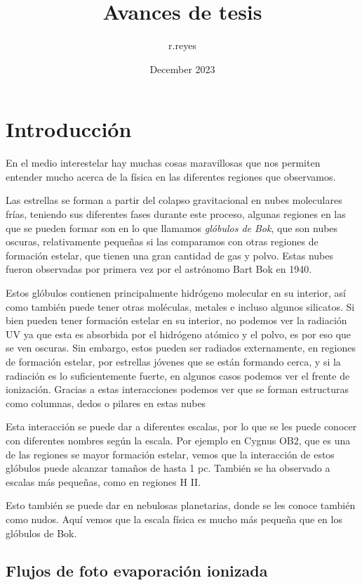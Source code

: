 \documentclass{book}
\title{Avances de tesis}
\author{r.reyes }
\date{December 2023}
\begin{document}
\maketitle

\tableofcontents

\newpage

\chapter{Introducción}

En el medio interestelar hay muchas cosas maravillosas que nos permiten entender mucho acerca de la física en las diferentes regiones que observamos.

Las estrellas se forman a partir del colapso gravitacional en nubes moleculares frías, teniendo sus diferentes fases durante este proceso, algunas regiones en las que se pueden formar son en lo que llamamos \textit{glóbulos de Bok}, que son nubes oscuras, relativamente pequeñas si las comparamos con otras regiones de formación estelar, que tienen una gran cantidad de gas y polvo. Estas nubes fueron observadas por primera vez por el astrónomo Bart Bok en 1940. 

Estos glóbulos contienen principalmente hidrógeno molecular en su interior, así como también puede tener otras moléculas, metales e incluso algunos silicatos. Si bien pueden tener formación estelar en su interior, no podemos ver la radiación UV ya que esta es absorbida por el hidrógeno atómico y el polvo, es por eso que se ven oscuras. Sin embargo, estos pueden ser radiados externamente, en regiones de formación estelar, por estrellas jóvenes que se están formando cerca, y si la radiación es lo suficientemente fuerte, en algunos casos podemos ver el frente de ionización. Gracias a estas interacciones podemos ver que se forman estructuras como columnas, dedos o pilares en estas nubes

Esta interacción se puede dar a diferentes escalas, por lo que se les puede conocer con diferentes nombres según la escala. Por ejemplo en Cygnus OB2, que es una de las regiones se mayor formación estelar, vemos que la interacción de estos glóbulos puede alcanzar tamaños de hasta 1 pc. También se ha observado a escalas más pequeñas, como en regiones H II. 

Esto también se puede dar en nebulosas planetarias, donde se les conoce también como nudos. Aquí vemos que la escala física es mucho más pequeña que en los glóbulos de Bok. 

\section{Flujos de foto evaporación ionizada}
\end{document}
